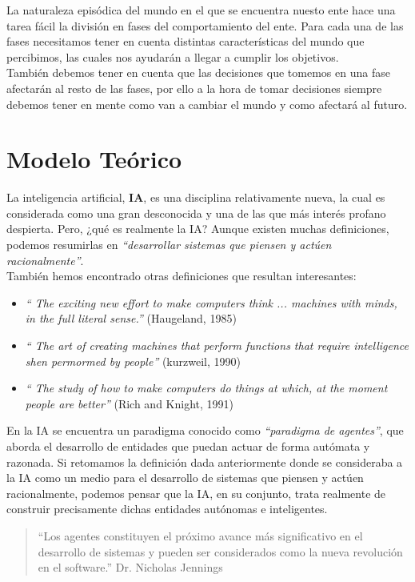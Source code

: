 \documentclass[a4paper,12pt,oneside]{book}
\begin{document}
La naturaleza episódica del mundo en el que se encuentra nuesto ente
hace una tarea fácil la división en fases del comportamiento del
ente. Para cada una de las fases necesitamos tener en cuenta distintas
características del mundo que percibimos, las cuales nos ayudarán a
llegar a cumplir los objetivos. \\

También debemos tener en cuenta que las decisiones que tomemos en una
fase afectarán al resto de las fases, por ello a la hora de tomar
decisiones siempre debemos tener en mente como van a cambiar el mundo
y como afectará al futuro.





\chapter{Modelo Teórico}
La inteligencia artificial, {\bf IA}, es una disciplina relativamente
nueva, la cual es considerada como una gran desconocida y una de las
que más interés profano despierta. Pero, {¿qué es realmente la IA?}
Aunque existen muchas definiciones, podemos resumirlas en {\it
  ``desarrollar sistemas que piensen y actúen racionalmente''}.\\

También hemos encontrado otras definiciones que resultan interesantes:
\begin{itemize}
\item {\it `` The exciting new effort to make computers think ... machines
    with minds, in the full literal sense.''} (Haugeland, 1985)\\
\item {\it `` The art of creating machines that perform functions that
    require intelligence shen permormed by people''} (kurzweil, 1990)\\
\item {\it `` The study of how to make computers do things at which, at the
    moment people are better''} (Rich and Knight, 1991)\\
\end{itemize}
En la IA se encuentra un paradigma conocido como {\it ``paradigma de
  agentes''}, que aborda el desarrollo de entidades que puedan actuar
de forma autómata y razonada. Si retomamos la definición dada
anteriormente donde se consideraba a la IA como un medio para el
desarrollo de sistemas que piensen y actúen racionalmente, podemos
pensar que la IA, en su conjunto, trata realmente de construir
precisamente dichas entidades autónomas e inteligentes.
\begin{quote}
  ``Los agentes constituyen el próximo avance más significativo en el
  desarrollo de sistemas y pueden ser considerados como la nueva
  revolución en el software.''
  Dr. Nicholas Jennings
\end{quote}
\end{document}
